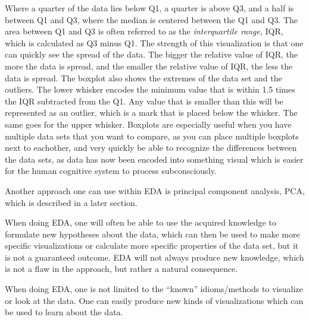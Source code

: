 \documentclass[Report.tex]{subfiles}
\begin{document}
Where a quarter of the data lies below Q1, a quarter is above Q3, and a half is between Q1 and Q3, where the median is centered between
the Q1 and Q3. The area between Q1 and Q3 is often referred to as the \emph{interquartile range}, IQR, which is calculated as Q3 minus Q1. The strength of this visualization is that one can quickly see the spread of the data. The bigger the relative value of IQR, the more the data is spread, and the smaller the relative value of IQR, the less the data is spread. The boxplot also shows the extremes of the data set and the outliers. The lower whisker encodes the minimum value that is within 1.5 times the IQR subtracted from the Q1. Any value that is smaller than this will be represented as an outlier, which is a mark that is placed below the whisker. The same goes for the upper whisker. Boxplots are especially useful when you have multiple data sets that you want to compare, as you can place multiple boxplots next to eachother, and very quickly be able to recognize the differences between the data sets, as data has now been encoded into something visual which is easier for the human cognitive system to process subconsciously.

Another approach one can use within EDA is principal component analysis, PCA, which is described in a later section.

When doing EDA, one will often be able to use the acquired knowledge to formulate new hypotheses about the data, which can then
be used to make more specific visualizations or calculate more specific properties of the data set, but it
is not a guaranteed outcome. EDA will not always produce new knowledge, which is not a flaw in the approach,
but rather a natural consequence.

When doing EDA, one is not limited to the ``known'' idioms/methods to visualize or look at the data. One can easily
produce new kinds of visualizations which can be used to learn about the data.


\end{document}
